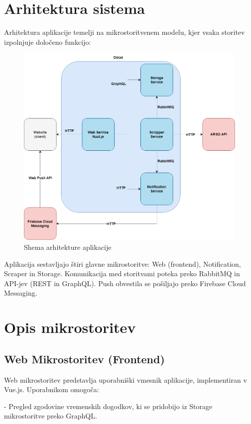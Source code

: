 \documentclass[a4paper,11pt]{article}
\begin{document}
\section*{Arhitektura sistema}
Arhitektura aplikacije temelji na mikrostoritvenem modelu, kjer vsaka storitev izpolnjuje dolo\v{c}eno funkcijo:
\begin{figure}[h!]
	\centering
	\includegraphics[width=\textwidth]{images/architecture.png}
	\caption{Shema arhitekture aplikacije}
\end{figure}

Aplikacija sestavljajo \v{s}tiri glavne mikrostoritve: Web (frontend), Notification, Scraper in Storage. Komunikacija med storitvami poteka preko RabbitMQ in API-jev (REST in GraphQL). Push obvestila se po\v{s}iljajo preko Firebase Cloud Messaging.

\section*{Opis mikrostoritev}
\subsection*{Web Mikrostoritev (Frontend)}
Web mikrostoritev predstavlja uporabni\v{s}ki vmesnik aplikacije, implementiran v Vue.js. Uporabnikom omogo\v{c}a:

- Pregled zgodovine vremenskih dogodkov, ki se pridobijo iz Storage mikrostoritve preko GraphQL.
\end{document}
